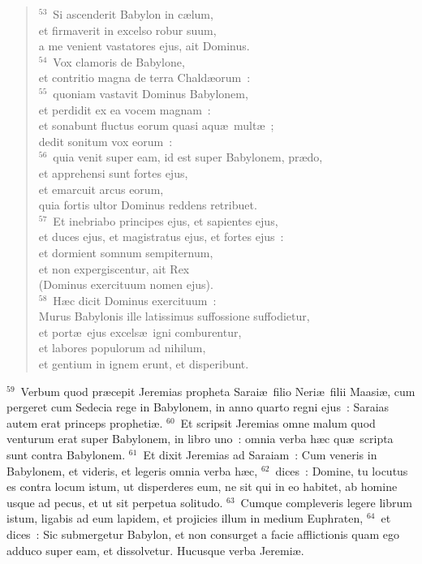 \begin{verse}
${}^{53}$~Si ascenderit Babylon in c\ae lum,\\ et firmaverit in excelso robur suum,\\ a me venient vastatores ejus, ait Dominus.\\
${}^{54}$~Vox clamoris de Babylone,\\ et contritio magna de terra Chald\ae orum~:\\
${}^{55}$~quoniam vastavit Dominus Babylonem,\\ et perdidit ex ea vocem magnam~:\\ et sonabunt fluctus eorum quasi aqu\ae\ mult\ae~;\\ dedit sonitum vox eorum~:\\
${}^{56}$~quia venit super eam, id est super Babylonem, pr\ae do,\\ et apprehensi sunt fortes ejus,\\ et emarcuit arcus eorum,\\ quia fortis ultor Dominus reddens retribuet.\\
${}^{57}$~Et inebriabo principes ejus, et sapientes ejus,\\ et duces ejus, et magistratus ejus, et fortes ejus~:\\ et dormient somnum sempiternum,\\ et non expergiscentur, ait Rex\\ (Dominus exercituum nomen ejus).\\
${}^{58}$~H\ae c dicit Dominus exercituum~:\\ Murus Babylonis ille latissimus suffossione suffodietur,\\ et port\ae\ ejus excels\ae\ igni comburentur,\\ et labores populorum ad nihilum,\\ et gentium in ignem erunt, et disperibunt.\end{verse}


${}^{59}$~Verbum quod pr\ae cepit Jeremias propheta Sarai\ae\ filio Neri\ae\ filii Maasi\ae , cum pergeret cum Sedecia rege in Babylonem, in anno quarto regni ejus~: Saraias autem erat princeps propheti\ae .
${}^{60}$~Et scripsit Jeremias omne malum quod venturum erat super Babylonem, in libro uno~: omnia verba h\ae c qu\ae\ scripta sunt contra Babylonem.
${}^{61}$~Et dixit Jeremias ad Saraiam~: Cum veneris in Babylonem, et videris, et legeris omnia verba h\ae c,
${}^{62}$~dices~: Domine, tu locutus es contra locum istum, ut disperderes eum, ne sit qui in eo habitet, ab homine usque ad pecus, et ut sit perpetua solitudo.
${}^{63}$~Cumque compleveris legere librum istum, ligabis ad eum lapidem, et projicies illum in medium Euphraten,
${}^{64}$~et dices~: Sic submergetur Babylon, et non consurget a facie afflictionis quam ego adduco super eam, et dissolvetur. Hucusque verba Jeremi\ae .

